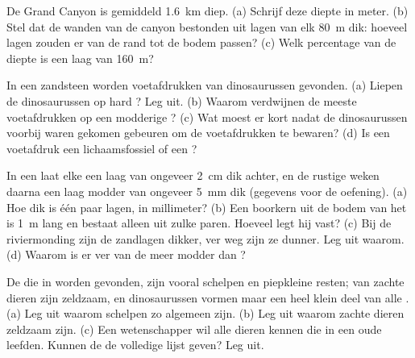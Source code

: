\begin{exercise}[$\star\star$]\label{exo:g7:sediments-and-fossils:9}
De Grand Canyon is gemiddeld \qty{1.6}{km} diep. (a) Schrijf deze diepte
in meter. (b) Stel dat de wanden van de canyon bestonden uit lagen van elk
\qty{80}{m} dik: hoeveel lagen zouden er van de rand tot de bodem passen?
(c) Welk percentage van de diepte is een laag van \qty{160}{m}?
\end{exercise}

\begin{exercise}[$\star\star$]\label{exo:g7:sediments-and-fossils:10}
In een zandsteen worden voetafdrukken van dinosaurussen gevonden. (a)
Liepen de dinosaurussen op hard ? Leg uit. (b) Waarom verdwijnen
de meeste voetafdrukken op een modderige ? (c) Wat moest er kort nadat
de dinosaurussen voorbij waren gekomen gebeuren om de voetafdrukken te
bewaren? (d) Is een voetafdruk een lichaamsfossiel of een ?
\end{exercise}

\begin{exercise}[$\star\star\star$]\label{exo:g7:sediments-and-fossils:11}
In een  laat elke  een laag  van ongeveer \qty{2}{cm}
dik achter, en de rustige weken daarna een laag modder van ongeveer
\qty{5}{mm} dik (gegevens voor de oefening). (a) Hoe dik is één paar lagen,
in millimeter? (b) Een boorkern uit de bodem van het  is \qty{1}{m}
lang en bestaat alleen uit zulke paren. Hoeveel  legt hij
vast? (c) Bij de riviermonding zijn de zandlagen dikker, ver weg zijn ze
dunner. Leg uit waarom. (d) Waarom is er ver van de  meer modder dan
?
\end{exercise}

\begin{exercise}[$\star\star\star$]\label{exo:g7:sediments-and-fossils:12}
De  die in  worden gevonden, zijn vooral schelpen en
piepkleine resten;  van zachte dieren zijn zeldzaam, en
dinosaurussen vormen maar een heel klein deel van alle . (a) Leg
uit waarom schelpen zo algemeen zijn. (b) Leg uit waarom zachte dieren
zeldzaam zijn. (c) Een wetenschapper wil alle dieren kennen die in een
oude  leefden. Kunnen de  de volledige lijst geven? Leg uit.
\end{exercise}


